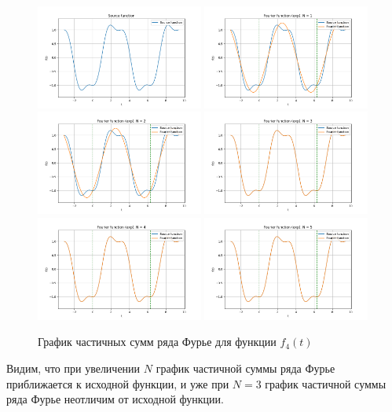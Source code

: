 \begin{figure}[ht!]
    \centering
    \includegraphics[width=0.49\textwidth]{media/plots/func_4_exp.png}
    \includegraphics[width=0.49\textwidth]{media/plots/func_4_exp_N_1.png}
    \includegraphics[width=0.49\textwidth]{media/plots/func_4_exp_N_2.png}
    \includegraphics[width=0.49\textwidth]{media/plots/func_4_exp_N_3.png}
    \includegraphics[width=0.49\textwidth]{media/plots/func_4_exp_N_4.png}
    \includegraphics[width=0.49\textwidth]{media/plots/func_4_exp_N_5.png}
    \caption{График частичных сумм ряда Фурье для функции $f_4(t)$}
    \label{fig:func_4_plot_exp}
\end{figure}

Видим, что при увеличении $N$ график частичной суммы ряда Фурье приближается к исходной функции, и уже при $N = 3$ график частичной суммы ряда Фурье неотличим от исходной функции.
